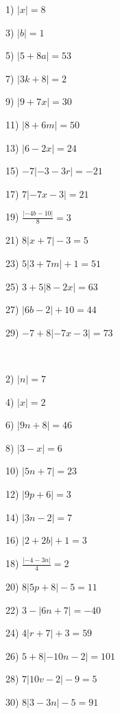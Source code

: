 \documentclass[11pt]{book}
\theoremstyle{definition}  %
\begin{document}
\begin{multicols}{2}
  1) $| x| = 8$
  
  3) $| b| = 1$
  
  5) $| 5 + 8 a| = 53$
  
  7) $|3k + 8| = 2$
  
  9) $|9 + 7 x| = 30$
  
  11) $|8 + 6 m| = 50$
  
  13) $|6 - 2 x| = 24$
  
  15) $- 7| - 3 - 3 r| = - 21$
  
  17) $7 | - 7 x - 3| = 21$
  
  19) $\frac{| - 4 b - 10|}{8} = 3$
  
  21) $8 | x + 7 | - 3 = 5$
  
  23) $5 |3 + 7 m| + 1 = 51$
  
  25) $3 + 5 |8 - 2 x| = 63$ \
  
  27) $|6b - 2| + 10 = 44$
  
  29) $- 7 + 8| - 7 x - 3| = 73$
  
  
  
  
  \
  
  2) $| n | = 7$
  
  4) $| x | = 2$
  
  6) $|9n + 8| = 46$
  
  8) $|3 - x| = 6$
  
  10) $|5n + 7| = 23$
  
  12) $|9p + 6| = 3$
  
  14) $|3n - 2| = 7$
  
  16) $| 2 + 2 b| + 1 = 3$
  
  18) $\frac{| - 4 - 3 n|}{4} = 2$
  
  20) $8 |5p + 8| - 5 = 11$
  
  22) $3 - |6n + 7| = - 40$
  
  24) $4 |r + 7| + 3 = 59$
  
  26) $5 + 8| - 10 n - 2| = 101$
  
  28) $7 |10v - 2| - 9 = 5$
  
  30) $8 |3 - 3 n| - 5 = 91$
  
  
  
\end{multicols}
\end{document}

